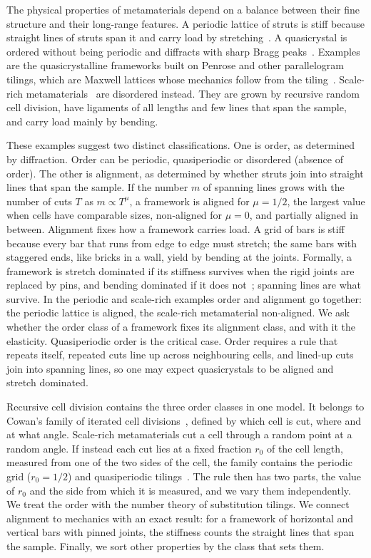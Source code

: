 \documentclass[aps,prl,twocolumn,superscriptaddress,amsmath,amssymb,floatfix]{revtex4-2}
\begin{document}
The physical properties of metamaterials depend on a balance between their fine structure and
their long-range features. A periodic lattice of struts is stiff because straight lines of
struts span it and carry load by stretching~\cite{deshpande2001}. A quasicrystal is ordered
without being periodic and diffracts with sharp Bragg peaks~\cite{shechtman1984}. Examples are the
quasicrystalline frameworks built on Penrose and other parallelogram tilings, which are Maxwell
lattices whose mechanics follow from the tiling~\cite{stenull2014,zhou2019}. Scale-rich
metamaterials~\cite{both2026} are disordered instead. They are grown by recursive random cell
division, have ligaments of all lengths and few lines that span the sample, and carry load
mainly by bending.

These examples suggest two distinct classifications. One is order, as determined by
diffraction. Order can be periodic, quasiperiodic or disordered (absence of order). The other
is alignment, as determined by whether struts join into straight lines that span the sample.
If the number $m$ of spanning lines grows with the number of cuts $T$ as $m\propto T^{\mu}$,
a framework is aligned for $\mu=1/2$, the largest value when cells have comparable sizes,
non-aligned for $\mu=0$, and partially aligned in between. Alignment fixes how a framework carries load. A grid of bars is stiff because every bar that
runs from edge to edge must stretch; the same bars with staggered ends, like bricks in a wall,
yield by bending at the joints. Formally, a framework is stretch dominated if its stiffness survives when the rigid joints are replaced by pins, and
bending dominated if it does not~\cite{deshpande2001}; spanning lines are what survive. In the
periodic and scale-rich examples order and alignment go together: the periodic lattice is
aligned, the scale-rich metamaterial non-aligned. We ask whether the order class of a
framework fixes its alignment class, and with it the elasticity. Quasiperiodic order is the
critical case. Order requires a rule that repeats itself, repeated cuts line up across
neighbouring cells, and lined-up cuts join into spanning lines, so one may expect quasicrystals
to be aligned and stretch dominated.

Recursive cell division contains the three order classes in one model. It belongs to Cowan's
family of iterated cell divisions~\cite{cowan2010}, defined by which cell is cut, where and at
what angle. Scale-rich metamaterials cut a cell through a random point at a random angle. If
instead each cut lies at a fixed fraction $r_0$ of the cell length, measured from one of the
two sides of the cell, the family contains the periodic grid ($r_0=1/2$) and quasiperiodic
tilings~\cite{baake2013,smilansky2020}. The rule then has two parts, the value of $r_0$ and
the side from which it is measured, and we vary them independently. We treat the order with
the number theory of substitution tilings. We connect alignment to mechanics with an exact
result: for a framework of horizontal and vertical bars with pinned joints, the stiffness
counts the straight lines that span the sample. Finally, we sort other properties by the class
that sets them.
\end{document}
